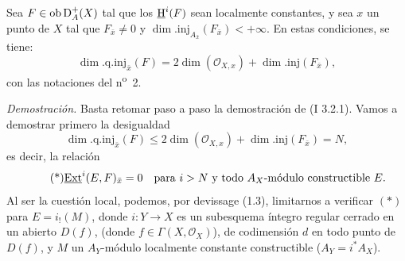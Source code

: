 Sea $F\in\operatorname{ob}\mathrm{D}_A^+(X)$ tal que los $\underline{\mathrm H}^i(F)$ sean localmente constantes, y sea $x$ un punto de $X$ tal que $F_{\bar{x}}\neq0$ y $\dim.\mathrm{inj}_{A_{\bar{x}}}(F_{\bar{x}})<+\infty$. En estas condiciones, se tiene:
\[
        \dim.\mathrm{q.inj}_{\bar{x}}(F)=2\dim(\mathcal{O}_{X,x})+\dim.\mathrm{inj}(F_{\bar{x}}),
\]
con las notaciones del n\textsuperscript{o}~2.

\emph{Demostración.} Basta retomar paso a paso la demostración de (I 3.2.1). Vamos a demostrar primero la desigualdad
\[
        \dim.\mathrm{q.inj}_{\bar{x}}(F)\leq 2\dim(\mathcal{O}_{X,x})+\dim.\mathrm{inj}(F_{\bar{x}})=N,
\]
es decir, la relación
\begin{equation}\tag{*}
        \underline{\operatorname{Ext}}^{i}(E,F)_{\bar{x}}=0\quad\hbox{para } i>N\hbox{ y todo }A_X\hbox{-módulo constructible }E.
\end{equation}
Al ser la cuestión local, podemos, por devissage (1.3), limitarnos a verificar $(*)$ para $E=i_!(M)$, donde $i:Y\to X$ es un subesquema íntegro regular cerrado en un abierto $D(f)$, (donde $f\in\Gamma(X,\mathcal{O}_X)$), de codimensión $d$ en todo punto de $D(f)$, y $M$ un $A_Y$-módulo localmente constante constructible ($A_Y=i^*A_X$).

